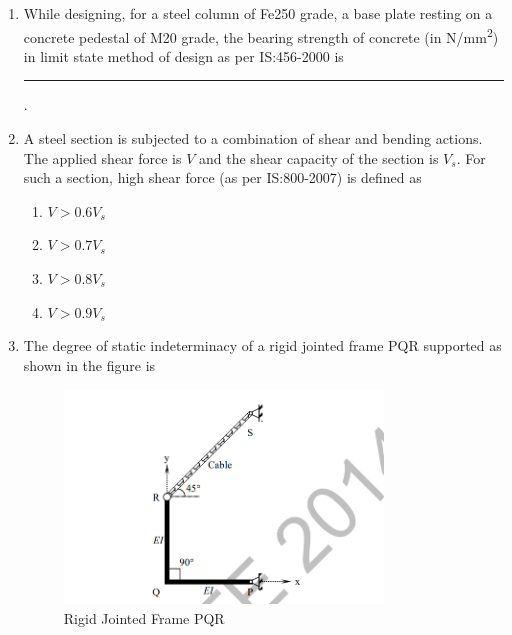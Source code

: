 \documentclass[journal,12pt,onecolumn]{IEEEtran}
\theoremstyle{remark}
\begin{document}
\begin{enumerate}
\item While designing, for a steel column of Fe250 grade, a base plate resting on a concrete pedestal of M20 grade, the bearing strength of concrete (in N/mm\textsuperscript{2}) in limit state method of design as per IS:456-2000 is \rule{3cm}{0.15mm}. \hfill{}


\item A steel section is subjected to a combination of shear and bending actions. The applied shear force is $V$ and the shear capacity of the section is $V_s$. For such a section, high shear force (as per IS:800-2007) is defined as \hfill{} \\

\begin{multicols}{2}
\begin{enumerate}
\item $V > 0.6V_s$
\item $V > 0.7V_s$
\item $V > 0.8V_s$
\item $V > 0.9V_s$
\end{enumerate}
\end{multicols}

\item The degree of static indeterminacy of a rigid jointed frame PQR supported as shown in the figure is \hfill{}

\begin{figure}[H]
    \centering
    \includegraphics[width=0.8\textwidth]{figs/image5.png}
    \caption{Rigid Jointed Frame PQR}
    \label{fig:rigid-jointed-frame}
\end{figure}


\end{enumerate}
\end{document}
